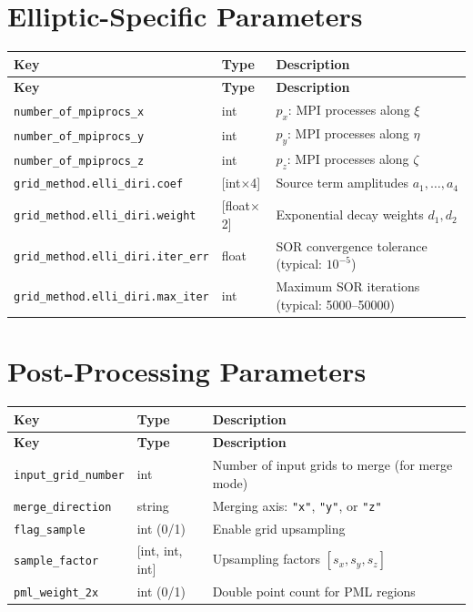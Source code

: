 \documentclass[11pt,a4paper]{report}
\begin{document}
\section{Elliptic-Specific Parameters}

\begin{longtable}{llp{7cm}}
\toprule
\textbf{Key} & \textbf{Type} & \textbf{Description} \\
\midrule
\endfirsthead
\toprule
\textbf{Key} & \textbf{Type} & \textbf{Description} \\
\midrule
\endhead
\bottomrule
\endlastfoot
\texttt{number\_of\_mpiprocs\_x} & int & $p_x$: MPI processes along $\xi$ \\
\texttt{number\_of\_mpiprocs\_y} & int & $p_y$: MPI processes along $\eta$ \\
\texttt{number\_of\_mpiprocs\_z} & int & $p_z$: MPI processes along $\zeta$ \\
\texttt{grid\_method.elli\_diri.coef} & [int$\times$4] & Source term amplitudes $a_1,\dots,a_4$ \\
\texttt{grid\_method.elli\_diri.weight} & [float$\times$2] & Exponential decay weights $d_1, d_2$ \\
\texttt{grid\_method.elli\_diri.iter\_err} & float & SOR convergence tolerance (typical: $10^{-5}$) \\
\texttt{grid\_method.elli\_diri.max\_iter} & int & Maximum SOR iterations (typical: 5000--50000) \\
\end{longtable}

\section{Post-Processing Parameters}

\begin{longtable}{llp{7cm}}
\toprule
\textbf{Key} & \textbf{Type} & \textbf{Description} \\
\midrule
\endfirsthead
\toprule
\textbf{Key} & \textbf{Type} & \textbf{Description} \\
\midrule
\endhead
\bottomrule
\endlastfoot
\texttt{input\_grid\_number} & int & Number of input grids to merge (for merge mode) \\
\texttt{merge\_direction} & string & Merging axis: \texttt{"x"}, \texttt{"y"}, or \texttt{"z"} \\
\texttt{flag\_sample} & int (0/1) & Enable grid upsampling \\
\texttt{sample\_factor} & [int, int, int] & Upsampling factors $[s_x, s_y, s_z]$ \\
\texttt{pml\_weight\_2x} & int (0/1) & Double point count for PML regions \\
\end{longtable}
\end{document}

